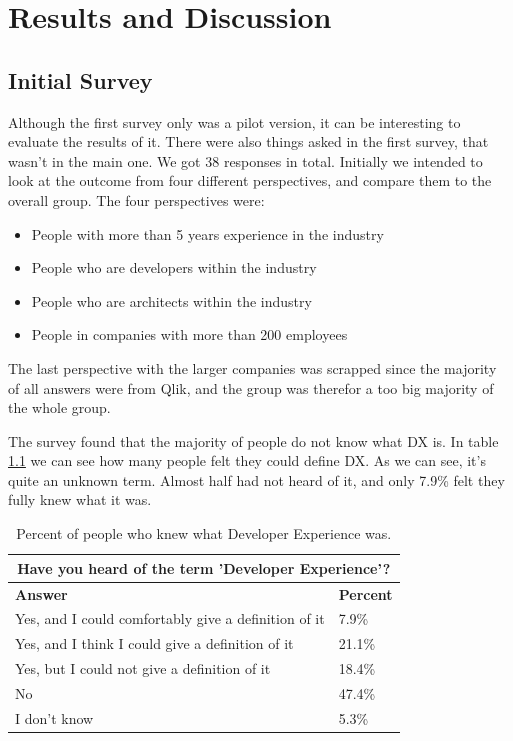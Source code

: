 \documentclass{cslthse-msc}
\begin{document}
    \chapter{Results and Discussion}

    \section{Initial Survey}
    Although the first survey only was a pilot version, it can be interesting to evaluate the results of it. There were also things asked in the first survey, that wasn't in the main one. We got 38 responses in total.
    Initially we intended to look at the outcome from four different perspectives, and compare them to the overall group. The four perspectives were:
    \begin{itemize}[label={}]
        \item People with more than 5 years experience in the industry
        \item People who are developers within the industry
        \item People who are architects within the industry
        \item People in companies with more than 200 employees
    \end{itemize}
    The last perspective with the larger companies was
    scrapped since the majority of all answers were from Qlik, and the group
    was therefor a too big majority of the whole group.

    The survey found that the majority of people do not know what DX is. In table \ref{tab:knowdx} we can see how many people felt they could define DX. As we can see, it's quite an unknown term. Almost half had not heard of it, and only 7.9\% felt they fully knew what it was.

    \begin{table}[H]
        \centering
        \caption{Percent of people who knew what Developer Experience was.}
        \label{tab:knowdx}
        \begin{tabularx}{\columnwidth}{X|l}
            \multicolumn{2}{c}{\textbf{Have you heard of the term 'Developer Experience'?}} \\ \hline \hline
            \textbf{Answer} & \textbf{Percent} \\ \hline
            Yes, and I could comfortably give a definition of it & 7.9\%  \\ \hline
            Yes, and I think I could give a definition of it & 	21.1\%  \\ \hline
            Yes, but I could not give a definition of it &	18.4\%  \\ \hline
            No &	47.4\%  \\ \hline
            I don't know & 5.3\% \\ \hline
        \end{tabularx}
    \end{table}
\end{document}
